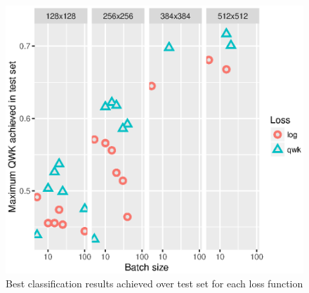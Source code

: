 \documentclass[times,twocolumn,final,authoryear]{elsarticle}
\begin{document}
\begin{figure}[!htb]
	\centering
	\includegraphics[scale=.70]{best.eps}
	\caption{Best classification results achieved over test set for each loss function}
	\label{fig:best}
\end{figure}
\end{document}
